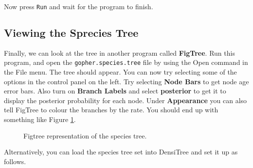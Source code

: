 \documentclass{article}
\begin{document}
Now press \texttt{Run} and wait for the program to finish.

\subsection*{Viewing the Sprecies Tree}

Finally, we can look at the tree in another program called {\bf FigTree}. Run this program, and open
the \texttt{gopher.species.tree} file by using the Open command in the File menu. The tree should appear.
You can now try selecting some of the options in the control panel on the left. Try selecting
{\bf Node Bars} to get node age error bars. Also turn on {\bf Branch Labels} and select {\bf posterior} to get
it to display the posterior probability for each node. Under {\bf Appearance} you can also tell FigTree
to colour the branches by the rate.
You should end up with something like Figure \ref{fig.figtree}.

\begin{figure}
\begin{center}


\end{center}
\caption{\label{fig.figtree} Figtree representation of the species tree.}
\end{figure}


Alternatively, you can load the species tree set into DensiTree and set it up as follows.
\end{document}
